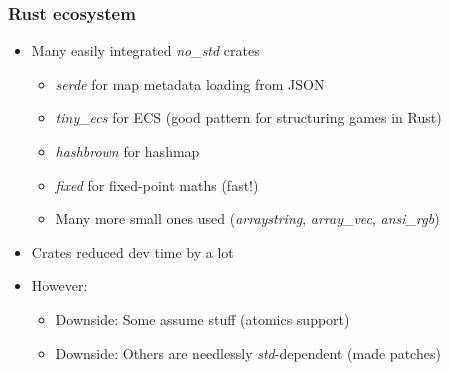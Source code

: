 \documentclass{beamer}
\begin{document}


\begin{frame}
	\frametitle{Rust ecosystem}
	\begin{itemize}
		\item Many easily integrated \emph{no\_std} crates
		      \begin{itemize}
			      \item \emph{serde} for map metadata loading from JSON
			      \item \emph{tiny\_ecs} for ECS (good pattern for structuring games in Rust)
			      \item \emph{hashbrown} for hashmap
			      \item \emph{fixed} for fixed-point maths (fast!)
			      \item Many more small ones used (\emph{arraystring}, \emph{array\_vec}, \emph{ansi\_rgb})
		      \end{itemize}
		\item Crates reduced dev time by a lot
		\item However: \begin{itemize}
			      \item Downside: Some assume stuff (atomics support)
			      \item Downside: Others are needlessly \emph{std}-dependent (made patches)
		      \end{itemize}

	\end{itemize}
\end{frame}
\end{document}
